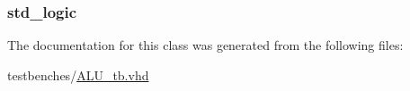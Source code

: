 \hypertarget{class_a_l_u__tb_1_1behavior_acb8805c41e29b9bb490d97fed2b1f020}{
\subsubsection[{clk}]{ {\bfseries std\-\_\-logic } }}\label{class_a_l_u__tb_1_1behavior_acb8805c41e29b9bb490d97fed2b1f020}


\-The documentation for this class was generated from the following files\-:\begin{DoxyCompactItemize}
\item 
testbenches/\hyperlink{_a_l_u__tb_8vhd}{\-A\-L\-U\-\_\-tb.\-vhd}\end{DoxyCompactItemize}
